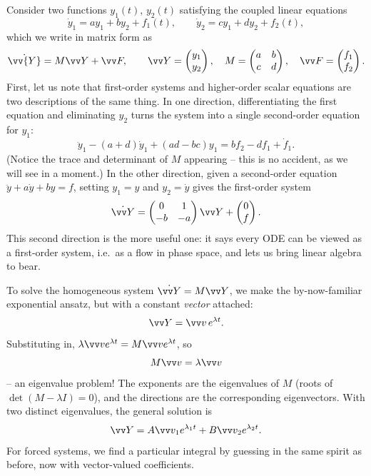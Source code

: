 Consider two functions $y_1(t)$, $y_2(t)$ satisfying the coupled linear equations
$$
\dot y_1 = a y_1 + b y_2 + f_1(t), \qquad \dot y_2 = c y_1 + d y_2 + f_2(t),
$$
which we write in matrix form as
$$
\dot{\vv{Y}} = M \vv Y + \vv F, \qquad
\vv Y = \begin{pmatrix} y_1 \\ y_2 \end{pmatrix}, \quad
M = \begin{pmatrix} a & b \\ c & d\end{pmatrix}, \quad
\vv F = \begin{pmatrix} f_1 \\ f_2 \end{pmatrix}.
$$
First, let us note that first-order systems and higher-order scalar equations are two descriptions of the same thing. In one direction, differentiating the first equation and eliminating $y_2$ turns the system into a single second-order equation for $y_1$:
$$
\ddot y_1 - (a + d) \dot y_1 + (ad - bc) y_1 = b f_2 - d f_1 + \dot f_1.
$$
(Notice the trace and determinant of $M$ appearing -- this is no accident, as we will see in a moment.) In the other direction, given a second-order equation $\ddot y + a \dot y + by = f$, setting $y_1 = y$ and $y_2 = \dot y$ gives the first-order system
$$
\dot{\vv Y} = \begin{pmatrix} 0 & 1 \\ -b & -a \end{pmatrix} \vv Y + \begin{pmatrix} 0 \\ f\end{pmatrix}.
$$
This second direction is the more useful one: it says every ODE can be viewed as a first-order system, i.e.\ as a flow in phase space, and lets us bring linear algebra to bear.

To solve the homogeneous system $\dot{\vv Y} = M \vv Y$, we make the by-now-familiar exponential ansatz, but with a constant \emph{vector} attached:
$$
\vv Y = \vv v \, e^{\lambda t}.
$$
Substituting in, $\lambda \vv v e^{\lambda t} = M \vv v e^{\lambda t}$, so
$$
M \vv v = \lambda \vv v
$$
-- an eigenvalue problem! The exponents are the eigenvalues of $M$ (roots of $\det(M - \lambda I) = 0$), and the directions are the corresponding eigenvectors. With two distinct eigenvalues, the general solution is
$$
\vv Y = A \vv v_1 e^{\lambda_1 t} + B \vv v_2 e^{\lambda_2 t}.
$$
For forced systems, we find a particular integral by guessing in the same spirit as before, now with vector-valued coefficients.


